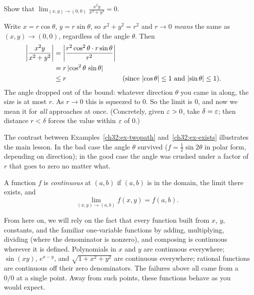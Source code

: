 \begin{example}
\label{ch32:ex-exists}
Show that $\displaystyle\lim_{(x,y)\to(0,0)} \frac{x^2 y}{x^2+y^2} = 0$.

Write $x=r\cos\theta$, $y=r\sin\theta$, so $x^2+y^2=r^2$ and $r\to 0$ \emph{means} the same as
$(x,y)\to(0,0)$, regardless of the angle $\theta$. Then
\begin{align*}
   \left\lvert \frac{x^2 y}{x^2+y^2} \right\rvert
   &= \left\lvert \frac{r^2\cos^2\theta \cdot r\sin\theta}{r^2} \right\rvert \\
   &= r\,\lvert\cos^2\theta\,\sin\theta\rvert \\
   &\le r && \text{(since $\lvert\cos\theta\rvert\le 1$ and $\lvert\sin\theta\rvert\le 1$).}
\end{align*}
The angle dropped out of the bound: whatever direction $\theta$ you came in along, the size is
at most $r$. As $r\to 0$ this is squeezed to $0$. So the limit is $0$, and now we mean it for
\emph{all} approaches at once. (Concretely, given $\varepsilon>0$, take $\delta=\varepsilon$; then distance
$r<\delta$ forces the value within $\varepsilon$ of $0$.)
\end{example}

The contrast between Examples~\ref{ch32:ex-twopath} and~\ref{ch32:ex-exists} illustrates the main
lesson. In the bad case the angle $\theta$ survived ($f=\tfrac12\sin 2\theta$ in polar form,
depending on direction); in the good case the angle was crushed under a factor of
$r$ that goes to zero no matter what.

\begin{definition}[Continuity]
\label{ch32:def-continuity}
A function $f$ is \emph{continuous} at $(a,b)$ if $(a,b)$ is in the domain, the limit there
exists, and
\[
   \lim_{(x,y)\to(a,b)} f(x,y) = f(a,b).
\]
\end{definition}

From here on, we will rely on the fact that every function built from
$x$, $y$, constants, and the familiar one-variable functions by adding, multiplying, dividing
(where the denominator is nonzero), and composing is continuous wherever it is defined.
Polynomials in $x$ and $y$ are continuous everywhere; $\sin(xy)$, $e^{x-y}$, and
$\sqrt{1+x^2+y^2}$ are continuous everywhere; rational functions are continuous off their zero
denominators. The failures above all came from a $0/0$ at a single point. Away from such
points, these functions behave as you would expect.

